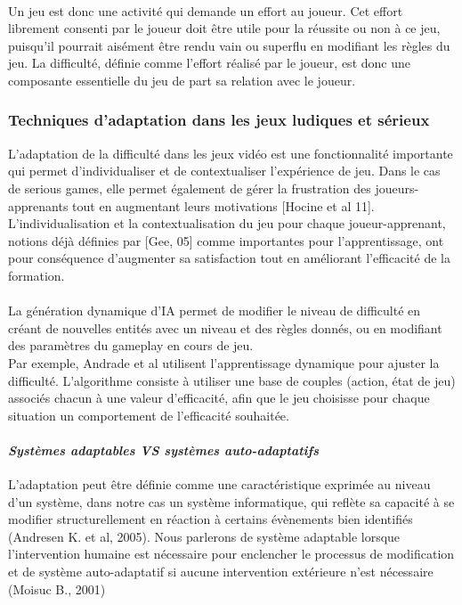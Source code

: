 \paragraph{}Un jeu est donc une activité qui demande un effort au joueur. Cet effort librement consenti par le joueur  doit être utile pour la réussite ou non à ce jeu, puisqu’il pourrait aisément être rendu vain ou superflu en modifiant les règles du jeu. La difficulté, définie comme l’effort réalisé par le joueur, est donc une composante essentielle du jeu de part sa relation avec le joueur.

		\subsubsection{Techniques d'adaptation dans les jeux ludiques et sérieux}
L'adaptation de la difficulté dans les jeux vidéo est une fonctionnalité importante qui permet d’individualiser et de contextualiser l'expérience de jeu. Dans le cas de serious games, elle permet également de gérer la frustration des joueurs-apprenants tout en augmentant leurs motivations [Hocine et al 11]. L'individualisation et la contextualisation du jeu pour chaque joueur-apprenant, notions déjà définies par [Gee, 05] comme importantes pour l'apprentissage, ont pour conséquence d'augmenter sa satisfaction tout en améliorant l’efficacité de la formation.
				
		\paragraph{}
La génération dynamique d’IA permet de modifier le niveau de difficulté en créant de nouvelles entités avec un niveau et des règles donnés, ou en modifiant des paramètres du gameplay en cours de jeu.\\
Par exemple, Andrade et al utilisent l’apprentissage dynamique pour ajuster la difficulté. L’algorithme consiste à utiliser une base de couples (action, état de jeu) associés chacun à une valeur d’efficacité, afin que le jeu choisisse pour chaque situation un comportement de l’efficacité souhaitée.			
				
		\paragraph{\emph{Systèmes adaptables VS systèmes auto-adaptatifs} \\ \quad} 
L’adaptation peut être définie comme une caractéristique exprimée au niveau d’un système, dans notre cas un système informatique, qui reflète sa capacité à se modifier structurellement en réaction à certains évènements bien identifiés (Andresen K. et al, 2005). Nous parlerons de système adaptable lorsque l’intervention humaine est nécessaire pour enclencher le processus de modification et de système auto-adaptatif si aucune intervention extérieure n'est nécessaire (Moisuc B., 2001)

